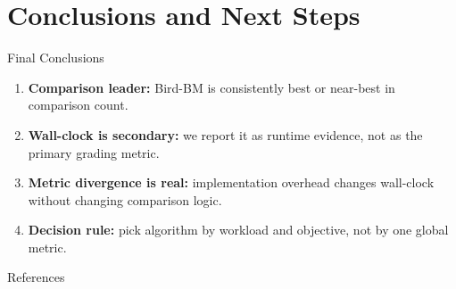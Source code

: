 \section{Conclusions and Next Steps}

\begin{frame}{Final Conclusions}
\begin{enumerate}
  \item \textbf{Comparison leader:} Bird-BM is consistently best or near-best in comparison count.
  \item \textbf{Wall-clock is secondary:} we report it as runtime evidence, not as the primary grading metric.
  \item \textbf{Metric divergence is real:} implementation overhead changes wall-clock without changing comparison logic.
  \item \textbf{Decision rule:} pick algorithm by workload and objective, not by one global metric.
\end{enumerate}
\end{frame}

\begin{frame}[allowframebreaks]{References}
\tiny


\end{frame}
